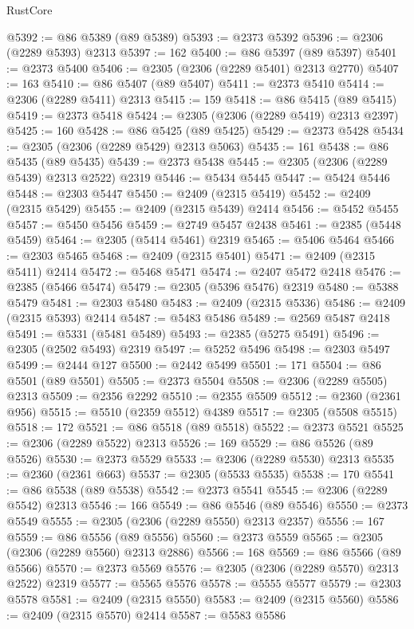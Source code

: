 \begin{lexlean}{RustCore}
\begin{coremodule}
@5392 := @86 @5389 (@89 @5389)
@5393 := @2373 @5392
@5396 := @2306 (@2289 @5393) @2313
@5397 := 162
@5400 := @86 @5397 (@89 @5397)
@5401 := @2373 @5400
@5406 := @2305 (@2306 (@2289 @5401) @2313 @2770)
@5407 := 163
@5410 := @86 @5407 (@89 @5407)
@5411 := @2373 @5410
@5414 := @2306 (@2289 @5411) @2313
@5415 := 159
@5418 := @86 @5415 (@89 @5415)
@5419 := @2373 @5418
@5424 := @2305 (@2306 (@2289 @5419) @2313 @2397)
@5425 := 160
@5428 := @86 @5425 (@89 @5425)
@5429 := @2373 @5428
@5434 := @2305 (@2306 (@2289 @5429) @2313 @5063)
@5435 := 161
@5438 := @86 @5435 (@89 @5435)
@5439 := @2373 @5438
@5445 := @2305 (@2306 (@2289 @5439) @2313 @2522) @2319
@5446 := @5434 @5445
@5447 := @5424 @5446
@5448 := @2303 @5447
@5450 := @2409 (@2315 @5419)
@5452 := @2409 (@2315 @5429)
@5455 := @2409 (@2315 @5439) @2414
@5456 := @5452 @5455
@5457 := @5450 @5456
@5459 := @2749 @5457 @2438
@5461 := @2385 (@5448 @5459)
@5464 := @2305 (@5414 @5461) @2319
@5465 := @5406 @5464
@5466 := @2303 @5465
@5468 := @2409 (@2315 @5401)
@5471 := @2409 (@2315 @5411) @2414
@5472 := @5468 @5471
@5474 := @2407 @5472 @2418
@5476 := @2385 (@5466 @5474)
@5479 := @2305 (@5396 @5476) @2319
@5480 := @5388 @5479
@5481 := @2303 @5480
@5483 := @2409 (@2315 @5336)
@5486 := @2409 (@2315 @5393) @2414
@5487 := @5483 @5486
@5489 := @2569 @5487 @2418
@5491 := @5331 (@5481 @5489)
@5493 := @2385 (@5275 @5491)
@5496 := @2305 (@2502 @5493) @2319
@5497 := @5252 @5496
@5498 := @2303 @5497
@5499 := @2444 @127
@5500 := @2442 @5499
@5501 := 171
@5504 := @86 @5501 (@89 @5501)
@5505 := @2373 @5504
@5508 := @2306 (@2289 @5505) @2313
@5509 := @2356 @2292
@5510 := @2355 @5509
@5512 := @2360 (@2361 @956)
@5515 := @5510 (@2359 @5512) @4389
@5517 := @2305 (@5508 @5515)
@5518 := 172
@5521 := @86 @5518 (@89 @5518)
@5522 := @2373 @5521
@5525 := @2306 (@2289 @5522) @2313
@5526 := 169
@5529 := @86 @5526 (@89 @5526)
@5530 := @2373 @5529
@5533 := @2306 (@2289 @5530) @2313
@5535 := @2360 (@2361 @663)
@5537 := @2305 (@5533 @5535)
@5538 := 170
@5541 := @86 @5538 (@89 @5538)
@5542 := @2373 @5541
@5545 := @2306 (@2289 @5542) @2313
@5546 := 166
@5549 := @86 @5546 (@89 @5546)
@5550 := @2373 @5549
@5555 := @2305 (@2306 (@2289 @5550) @2313 @2357)
@5556 := 167
@5559 := @86 @5556 (@89 @5556)
@5560 := @2373 @5559
@5565 := @2305 (@2306 (@2289 @5560) @2313 @2886)
@5566 := 168
@5569 := @86 @5566 (@89 @5566)
@5570 := @2373 @5569
@5576 := @2305 (@2306 (@2289 @5570) @2313 @2522) @2319
@5577 := @5565 @5576
@5578 := @5555 @5577
@5579 := @2303 @5578
@5581 := @2409 (@2315 @5550)
@5583 := @2409 (@2315 @5560)
@5586 := @2409 (@2315 @5570) @2414
@5587 := @5583 @5586

\end{coremodule}
\end{lexlean}
